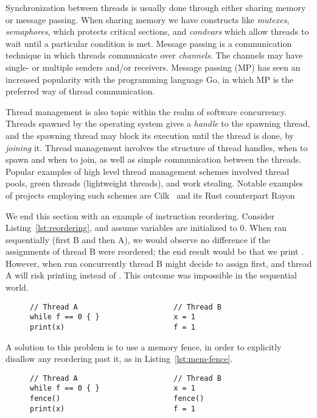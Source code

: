 \documentclass[b5paper]{report}
\begin{document}
Synchronization between threads is usually done through either sharing memory or
message passing. When sharing memory we have constructs like \emph{mutexes},
\emph{semaphores}, which protects critical sections, and \emph{condvars} which
allow threads to wait until a particular condition is met. Message passing is a
communication technique in which threads communicate over \emph{channels}.
The channels may have single- or multiple senders and/or receivers. Message
passing (MP) has seen an increased popularity with the programming language Go, in
which MP is the preferred way of thread communication.

Thread management is also topic within the realm of software concurrency.
Threads spawned by the operating system gives a \emph{handle} to the spawning
thread, and the spawning thread may block its execution until the thread is done,
by \emph{joining} it. Thread management involves the structure of thread
handles, when to spawn and when to join, as well as simple communication
between the threads. Popular examples of high level thread management schemes
involved thread pools, green threads (lightweight threads), and work stealing.
Notable examples of projects employing such schemes are Cilk~\cite{cilk} and
its Rust counterpart Rayon~\cite{rayon}

We end this section with an example of instruction reordering. Consider
Listing~\ref{lst:reordering}, and assume variables are initialized to 0.  When
ran sequentially (first B and then A), we would observe no difference if the
assignments of thread B were reordered; the end result would be that we print
. However, when run concurrently thread B might decide to assign  first, and thread A will risk printing  instead of . This
outcome was impossible in the sequential world.
\begin{figure}[ht]
\begin{lstlisting}[caption=Instruction reordering,label=lst:reordering]
// Thread A                      // Thread B
while f == 0 { }                 x = 1
print(x)                         f = 1
\end{lstlisting}
\end{figure}

A solution to this problem is to use a memory fence, in order to explicitly
disallow any reordering past it, as in Listing~\ref{lst:mem-fence}.
\begin{figure}[ht]
\begin{lstlisting}[caption=Memory fence for synchronization,label=lst:mem-fence]
// Thread A                      // Thread B
while f == 0 { }                 x = 1
fence()                          fence()
print(x)                         f = 1
\end{lstlisting}
\end{figure}
\end{document}
